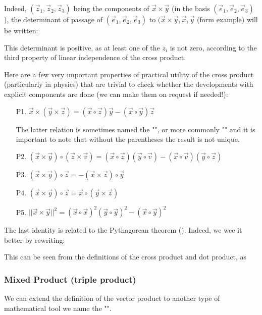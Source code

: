 	Indeed, $(\vec{z}_1,\vec{z}_2,\vec{z}_3)$ being the components of $\vec{x}\times \vec{y}$ (in the basis $(\vec{e}_1,\vec{e}_2,\vec{e}_3)$), the determinant of passage of $(\vec{e}_1,\vec{e}_2,\vec{e}_3)$ to $(\vec{x}\times \vec{y},\vec{x},\vec{y}$ (form example) will be written:
	 
	 This determinant is positive, as at least one of the $z_i$ is not zero, according to the third property of linear independence of the cross product.
	 
	 Here are a few very important properties of practical utility of the cross product (particularly in physics) that are trivial to check whether the developments with explicit components are done (we can make them on  request if needed!):
	\begin{enumerate}
		\item[P1.] $\vec{x}\times(\vec{y}\times\vec{z})=(\vec{x}\circ\vec{z})\vec{y}-(\vec{x}\circ\vec{y})\vec{z}$
		\begin{tcolorbox}[title=Remark,colframe=black,arc=10pt]
		The latter relation is sometimes named the "", or more commonly "" and it is important to note that without the parentheses the result is not unique.
		\end{tcolorbox}	
		
		\item[P2.] $(\vec{x}\times\vec{y})\circ (\vec{z}\times\vec{v})=(\vec{x}\circ\vec{z})(\vec{y}\circ\vec{v})-(\vec{x}\circ\vec{v})(\vec{y}\circ\vec{z})$
		
		\item[P3.] $(\vec{x}\times\vec{y})\circ\vec{z}=-(\vec{x}\times\vec{z})\circ \vec{y}$
		
		\item[P4.] $(\vec{x}\times\vec{y})\circ\vec{z}=\vec{x}\circ(\vec{y}\times\vec{z})$
		
		\item[P5.] $||\vec{x}\times\vec{y}||^2=(\vec{x}\circ\vec{x})^2(\vec{y}\circ\vec{y})^2-(\vec{x}\circ\vec{y})^2$
	\end{enumerate}
	The last identity is related to the Pythagorean theorem (). Indeed, we wee it better by rewriting:
	
	This can be seen from the definitions of the cross product and dot product, as
	
	
	\pagebreak
	\subsubsection{Mixed Product (triple product)}
	We can extend the definition of the vector product to another type of mathematical tool we name the "".
	
